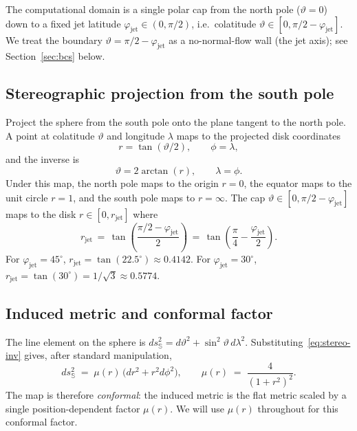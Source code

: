 \documentclass[11pt]{article}
\newcommand{\rjet}{r_{\mathrm{jet}}}
\newcommand{\phijet}{\varphi_{\mathrm{jet}}}
\begin{document}
The computational domain is a single polar cap from the north pole
($\vartheta = 0$) down to a fixed jet latitude $\phijet \in (0, \pi/2)$,
i.e.\ colatitude $\vartheta \in [0, \pi/2 - \phijet]$.  We treat the
boundary $\vartheta = \pi/2 - \phijet$ as a no-normal-flow wall (the
jet axis); see Section~\ref{sec:bcs} below.

\subsection{Stereographic projection from the south pole}

Project the sphere from the south pole onto the plane tangent to the
north pole.  A point at colatitude $\vartheta$ and longitude $\lambda$
maps to the projected disk coordinates
\begin{equation}
  r = \tan(\vartheta/2), \qquad \phi = \lambda,
  \label{eq:stereo-fwd}
\end{equation}
and the inverse is
\begin{equation}
  \vartheta = 2 \arctan(r), \qquad \lambda = \phi.
  \label{eq:stereo-inv}
\end{equation}
Under this map, the north pole maps to the origin $r=0$, the equator
maps to the unit circle $r = 1$, and the south pole maps to $r = \infty$.
The cap $\vartheta \in [0, \pi/2 - \phijet]$ maps to the disk
$r \in [0, \rjet]$ where
\begin{equation}
  \rjet \,=\, \tan\!\left(\frac{\pi/2 - \phijet}{2}\right)
        \,=\, \tan\!\left(\frac{\pi}{4} - \frac{\phijet}{2}\right).
  \label{eq:rjet}
\end{equation}
For $\phijet = 45^\circ$, $\rjet = \tan(22.5^\circ) \approx 0.4142$.
For $\phijet = 30^\circ$, $\rjet = \tan(30^\circ) = 1/\sqrt{3} \approx 0.5774$.

\subsection{Induced metric and conformal factor}

The line element on the sphere is $ds_{\mathbb{S}}^{2} = d\vartheta^{2}
+ \sin^{2}\vartheta \, d\lambda^{2}$.  Substituting~\eqref{eq:stereo-inv}
gives, after standard manipulation,
\begin{equation}
  ds_{\mathbb{S}}^{2} \;=\; \mu(r)\,\bigl(dr^{2} + r^{2} d\phi^{2}\bigr),
  \qquad
  \mu(r) \;=\; \frac{4}{(1+r^{2})^{2}}.
  \label{eq:metric}
\end{equation}
The map is therefore \emph{conformal}: the induced metric is the flat
metric scaled by a single position-dependent factor $\mu(r)$.  We will
use $\mu(r)$ throughout for this conformal factor.
\end{document}
